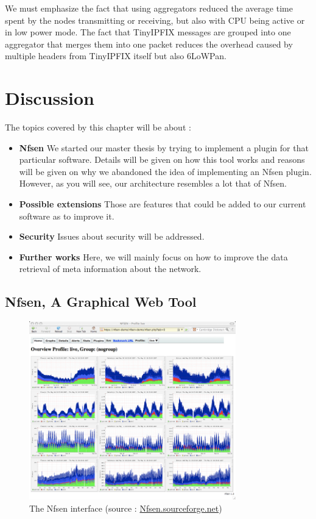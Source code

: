 We must emphasize the fact that using aggregators reduced the average time spent by the nodes transmitting or receiving, but also with CPU being active or in low power mode. The fact that TinyIPFIX messages are grouped into one aggregator that merges them into one packet reduces the overhead caused by multiple headers from TinyIPFIX itself but also 6LoWPan.


\chapter{Discussion}

The topics covered by this chapter will be about :

\begin{itemize}
	\item \textbf{Nfsen} We started our master thesis by trying to implement a plugin for that particular software. Details will be given on how this tool works and reasons will be given on why we abandoned the idea of implementing an Nfsen plugin. However, as you will see, our architecture resembles a lot that of Nfsen.
	\item \textbf{Possible extensions} Those are features that could be added to our current software as to improve it.
	\item \textbf{Security} Issues about security will be addressed.
  \item \textbf{Further works} Here, we will mainly focus on how to improve the data retrieval of meta information about the network.
\end{itemize}

\section{Nfsen, A Graphical Web Tool}

\begin{figure}[!h]
	\centering
	\includegraphics[width=0.8\textwidth]{res/nfsen.png}
	\caption{The Nfsen interface (source : \url{Nfsen.sourceforge.net})}
	\label{fig:Nfsen}
\end{figure}


